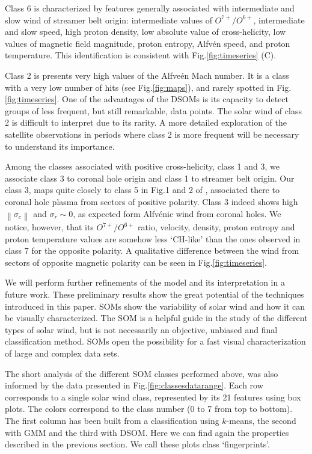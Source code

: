 \documentclass[utf8]{frontiersSCNS} %
\begin{document}
Class 6 is characterized by features generally associated with intermediate and slow wind of streamer belt origin: intermediate values of $O^{7+}/O^{6+}$, intermediate and slow speed, high proton density, low absolute value of cross-helicity, low values of magnetic field magnitude, proton entropy, Alfv\'en speed, and proton temperature. This identification is consistent with Fig.\ref{fig:timeseries} (C).

Class 2 is presents very high values of the Alfve\'en Mach number. It is a class with a very low number of hits (see Fig.\ref{fig:maps}), and rarely spotted in Fig.\ref{fig:timeseries}. One of the advantages of the DSOMs is its capacity to detect groups of less frequent, but still remarkable, data points. The solar wind of class 2 is difficult to interpret due to its rarity. A more detailed exploration of the satellite observations in periods where class 2 is more frequent will be necessary to understand its importance.

Among the classes associated with positive cross-helicity, class 1 and 3, we associate class 3 to coronal hole origin and class 1 to streamer belt origin. Our class 3, maps quite closely to class 5 in Fig.1 and 2 of \citep{Roberts2020}, associated there to coronal hole plasma from sectors of positive polarity. Class 3 indeed shows high $\left\lVert \sigma_c \right\rVert$ and $\sigma_r\sim 0$, as expected form Alfv\'enic wind from coronal holes. We notice, however, that its $O^{7+}/O^{6+}$ ratio, velocity, density, proton entropy and proton temperature values are somehow less `CH-like' than the ones observed in class 7 for the opposite polarity. A qualitative difference between the wind from sectors of opposite magnetic polarity can be seen in Fig.\ref{fig:timeseries}.

We will perform further refinements of the model and its interpretation in a future work. These preliminary results show the great potential of the techniques introduced in this paper. SOMs show the variability of solar wind and how it can be visually characterized. The SOM is a helpful guide in the study of the different types of solar wind, but is not necessarily an objective, unbiased and final classification method. SOMs open the possibility for a fast visual characterization of large and complex data sets.

The short analysis of the different SOM classes performed above, was also informed by the data presented in Fig.\ref{fig:classesdatarange}. Each row corresponds to a single solar wind class, represented by its 21 features using box plots. The colors correspond to the class number (0 to 7 from top to bottom). The first column has been built from a classification using $k$-means, the second with GMM and the third with DSOM. Here we can find again the properties described in the previous section. We call these plots class `fingerprints'.
\end{document}
